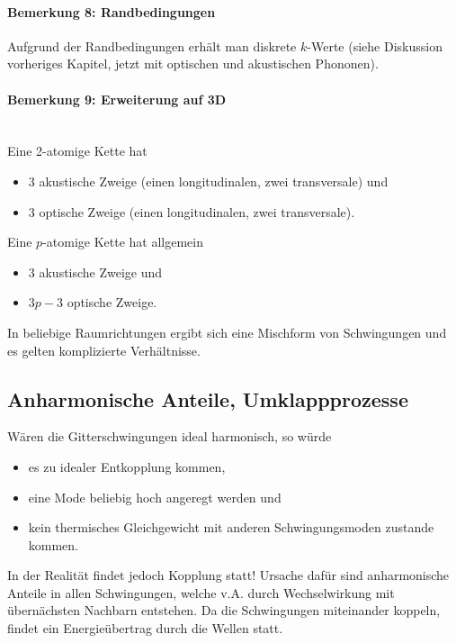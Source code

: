 \paragraph{Bemerkung 8: Randbedingungen}
	Aufgrund der Randbedingungen erhält man diskrete $k$-Werte (siehe Diskussion vorheriges Kapitel, jetzt mit optischen und akustischen Phononen).

\paragraph{Bemerkung 9: Erweiterung auf 3D}~\\
	Eine 2-atomige Kette hat
	\begin{itemize}
		\item 3 akustische Zweige (einen longitudinalen, zwei transversale) und
		\item 3 optische Zweige (einen longitudinalen, zwei transversale).
	\end{itemize}
	Eine $p$-atomige Kette hat allgemein
	\begin{itemize}
		\item 3 akustische Zweige und
		\item $3p-3$ optische Zweige.
	\end{itemize}
	In beliebige Raumrichtungen ergibt sich eine Mischform von Schwingungen und es gelten komplizierte Verhältnisse.

\subsection{Anharmonische Anteile, Umklappprozesse} 
	Wären die Gitterschwingungen ideal harmonisch, so würde 
	\begin{itemize}
		\item es zu idealer Entkopplung kommen,
		\item eine Mode beliebig hoch angeregt werden und
		\item kein thermisches Gleichgewicht mit anderen Schwingungsmoden zustande kommen.
	\end{itemize}
	In der Realität findet jedoch Kopplung statt! 
	Ursache dafür sind anharmonische Anteile in allen Schwingungen, welche v.A. durch Wechselwirkung mit übernächsten Nachbarn entstehen. 
	Da die Schwingungen miteinander koppeln, findet ein Energieübertrag durch die Wellen statt.
	
